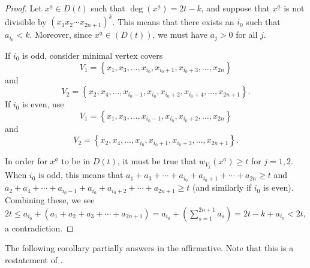 \documentclass[12pt]{amsart}
\def\set#1{\left\{ {#1} \right\}}
\renewcommand{\geq}{\geqslant}
\renewcommand{\le}{\leqslant}
\theoremstyle{plain}
\theoremstyle{definition}
\begin{document}
\begin{proof}
Let $x^{\underline{a}} \in D(t)$ such that $\deg(x^{\underline{a}}) = 2t - k$, and suppose that $x^{\underline{a}}$ is not divisible by $(x_1 x_2 \cdots x_{2n+1})^k$. 
This means that there exists an $i_0$ such that $a_{i_0} < k$. Moreover, since $x^{\underline{a}} \in (D(t))$, we must have $a_j > 0$ for all $j$.

If ${i_0}$ is odd, consider minimal vertex covers 
\[
V_1 = \set{x_1, x_3,\ldots, x_{i_0},x_{i_0+1},x_{i_0+3},\ldots,x_{2n}}
\] 
and 
\[
V_2 = \set{x_2, x_4, \ldots, x_{i_0-1}, x_{i_0}, x_{i_0+2},x_{i_0+4},\ldots,x_{2n+1}}.
\]
If $i_0$ is even, use 
\[
V_1 = \set{x_1,x_3,\ldots,x_{i_0-1},x_{i_0},x_{i_0+2},\ldots,x_{2n}}
\]
and 
\[
V_2 = \set{x_2,x_4,\ldots,x_{i_0},x_{i_0+1},x_{i_0+3},\ldots,x_{2n+1}}.
\]
%

In order for $x^{\underline{a}}$ to be in $D(t)$, it must be true that $w_{V_j}(x^{\underline{a}}) \geq t$ for $j=1,2$. 
When $i_0$ is odd, this means that $a_1 + a_3 +\cdots + a_{i_0} + a_{i_0+1} + \cdots + a_{2n} \geq t$ and $a_2 + a_4 + \cdots + a_{i_0-1} + a_{i_0} + a_{i_0+2} +\cdots +a_{2n+1} \geq t$ (and similarly if $i_0$ is even). 
Combining these, we see $2t \le a_{i_0} + (a_1 +a_2 +a_3 +\cdots + a_{2n+1}) = a_{i_0} + \left(\sum_{s=1}^{2n+1} a_s \right) = 2t-k+a_{i_0} < 2t$, a contradiction.
%
%
%
%
%
\end{proof}



The following corollary partially answers \cite[Conjecture 15]{2004:worthenelliswilson} in the affirmative.
Note that this is a restatement of \cite[Theorem 4.13]{2017DaoEtAl}.
\end{document}
